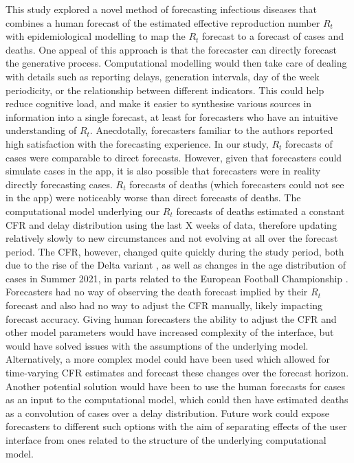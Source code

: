 \documentclass[10pt,a4paper,twocolumn]{article}
\begin{document}
This study explored a novel method of forecasting infectious diseases that combines a human forecast of the estimated effective reproduction number $R_t$ with epidemiological modelling to map the $R_t$ forecast to a forecast of cases and deaths. One appeal of this approach is that the forecaster can directly forecast the generative process. Computational modelling would then take care of dealing with details such as reporting delays, generation intervals, day of the week periodicity, or the relationship between different indicators. This could help reduce cognitive load, and make it easier to synthesise various sources in information into a single forecast, at least for forecasters who have an intuitive understanding of $R_t$. Anecdotally, forecasters familiar to the authors reported high satisfaction with the forecasting experience. In our study, $R_t$ forecasts of cases were comparable to direct forecasts. However, given that forecasters could simulate cases in the app, it is also possible that forecasters were in reality directly forecasting cases. 
$R_t$ forecasts of deaths (which forecasters could not see in the app) were noticeably worse than direct forecasts of deaths. The computational model underlying our $R_t$ forecasts of deaths estimated a constant CFR and delay distribution using the last X weeks of data, therefore updating relatively slowly to new circumstances and not evolving at all over the forecast period. The CFR, however, changed quite quickly during the study period, both due to the rise of the Delta variant \citep{bastIncreasedRiskHospitalisation2021}, as well as changes in the age distribution of cases in Summer 2021, in parts related to the European Football Championship \citep{dehningImpactEuro20202023}. Forecasters had no way of observing the death forecast implied by their $R_t$ forecast and also had no way to adjust the CFR manually, likely impacting forecast accuracy. Giving human forecasters the ability to adjust the CFR and other model parameters would have increased complexity of the interface, but would have solved issues with the assumptions of the underlying model. Alternatively, a more complex model could have been used which allowed for time-varying CFR estimates and forecast these changes over the forecast horizon. Another potential solution would have been to use the human forecasts for cases as an input to the computational model, which could then have estimated deaths as a convolution of cases over a delay distribution. Future work could expose forecasters to different such options with the aim of separating effects of the user interface from ones related to the structure of the underlying computational model.
\end{document}
